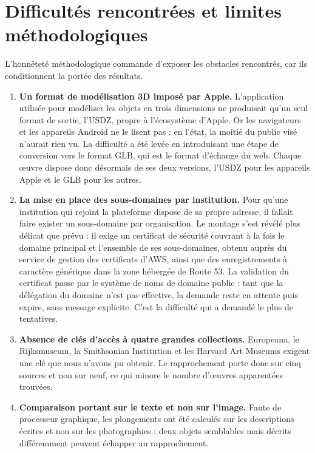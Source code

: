 \section{Difficultés rencontrées et limites méthodologiques}
\label{sec:difficultes}

L'honnêteté méthodologique commande d'exposer les obstacles rencontrés, car ils
conditionnent la portée des résultats.

\begin{enumerate}
  \item \textbf{Un format de modélisation 3D imposé par Apple.} L'application
        utilisée pour modéliser les objets en trois dimensions ne produisait
        qu'un seul format de sortie, l'USDZ, propre à l'écosystème d'Apple. Or
        les navigateurs et les appareils Android ne le lisent pas : en l'état,
        la moitié du public visé n'aurait rien vu. La difficulté a été levée en
        introduisant une étape de conversion vers le format GLB, qui est le
        format d'échange du web. Chaque œuvre dispose donc désormais de ses deux
        versions, l'USDZ pour les appareils Apple et le GLB pour les autres.

  \item \textbf{La mise en place des sous-domaines par institution.} Pour qu'une
        institution qui rejoint la plateforme dispose de sa propre adresse, il
        fallait faire exister un sous-domaine par organisation. Le montage s'est
        révélé plus délicat que prévu : il exige un certificat de sécurité
        couvrant à la fois le domaine principal et l'ensemble de ses
        sous-domaines, obtenu auprès du service de gestion des certificats
        d'AWS, ainsi que des enregistrements à caractère générique dans la zone
        hébergée de Route 53. La validation du certificat passe par le système
        de noms de domaine public : tant que la délégation du domaine n'est pas
        effective, la demande reste en attente puis expire, sans message
        explicite. C'est la difficulté qui a demandé le plus de tentatives.

  \item \textbf{Absence de clés d'accès à quatre grandes collections.} Europeana,
        le Rijksmuseum, la Smithsonian Institution et les Harvard Art Museums
        exigent une clé que nous n'avons pu obtenir. Le rapprochement porte donc
        sur cinq sources et non sur neuf, ce qui minore le nombre d'œuvres
        apparentées trouvées.

  \item \textbf{Comparaison portant sur le texte et non sur l'image.} Faute de
        processeur graphique, les plongements ont été calculés sur les
        descriptions écrites et non sur les photographies : deux objets
        semblables mais décrits différemment peuvent échapper au rapprochement.
\end{enumerate}

